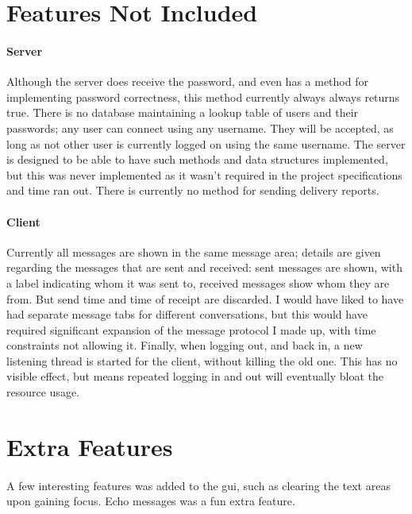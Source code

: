 \documentclass[12pt]{article}
\begin{document}
\section{Features Not Included}

\paragraph{Server}
Although the server does receive the password, and even has a method for
implementing password correctness, this method currently always always returns
true.  There is no database maintaining a lookup table of users and their
passwords; any user can connect using any username.  They will be accepted, as
long as not other user is currently logged on using the same username. The
server is designed to be able to have such methods and data structures
implemented, but this was never implemented as it wasn't required in the
project specifications and time ran out. 
There is currently no method for sending delivery reports.

\paragraph{Client}
Currently all messages are shown in the same message area;  details are given
regarding the messages that are sent and received:  sent messages are shown,
with a label indicating whom it was sent to, received messages show whom they
are from. But send time and time of receipt are discarded. I would have liked to
have had separate message tabs for different conversations, but this would have
required significant expansion of the message protocol I made up, with time
constraints not allowing it. Finally, when logging out, and back in, a new
listening thread is started for the client, without killing the old one.  This
has no visible effect, but means repeated logging in and out will eventually
bloat the resource usage.  

\section{Extra Features}
\paragraph{}

A few interesting features was added to the gui, such as clearing the text areas
upon gaining focus.  Echo messages was a fun extra feature.  
\end{document}
